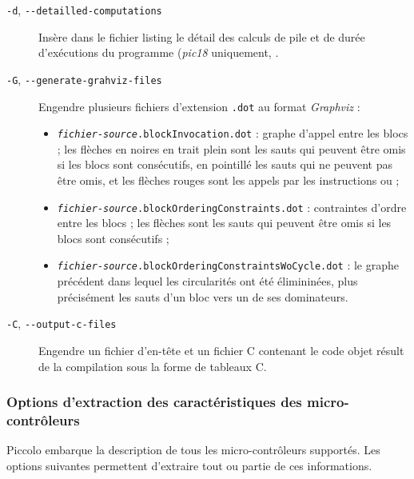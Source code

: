\begin{description}
  \item[\texttt{-d}, \texttt{-{-}detailled-computations}] Insère dans le fichier listing le détail des calculs de pile et de durée d'exécutions du programme (\emph{pic18} uniquement, .

  \item[\texttt{-G}, \texttt{-{-}generate-grahviz-files}] Engendre plusieurs fichiers d'extension \texttt{.dot} au format \emph{Graphviz} :
\begin{itemize}
\item \texttt{\emph{fichier-source}.blockInvocation.dot} : graphe d'appel entre les blocs ; les flèches en noires en trait plein sont les sauts qui peuvent être omis si les blocs sont consécutifs, en pointillé les sauts qui ne peuvent pas être omis, et les flèches rouges sont les appels par les instructions  ou  ; 
\item \texttt{\emph{fichier-source}.blockOrderingConstraints.dot} : contraintes d'ordre entre les blocs ; les flèches sont les sauts qui peuvent être omis si les blocs sont consécutifs ; 
\item \texttt{\emph{fichier-source}.blockOrderingConstraintsWoCycle.dot} : le graphe précédent dans lequel les circularités ont été élimininées, plus précisément les sauts d'un bloc vers un de ses dominateurs. 
\end{itemize}

  \item[\texttt{-C}, \texttt{-{-}output-c-files}] Engendre un fichier d'en-tête et un fichier C contenant le code objet résult de la compilation sous la forme de tableaux C.

\end{description}



\subsubsection{Options d'extraction des caractéristiques des micro-contrôleurs}

Piccolo embarque la description de tous les micro-contrôleurs supportés. Les options suivantes permettent d'extraire tout ou partie de ces informations.

